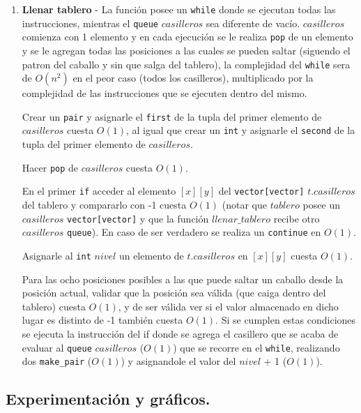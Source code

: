 \begin{enumerate}
 \item \textbf{Llenar tablero} - La función posee un \verb|while| donde se ejecutan
 todas las instrucciones, mientras el \verb|queue| $casilleros$ sea diferente de vacío.
 $casilleros$ comienza con 1 elemento y en cada ejecución se le realiza
 \verb|pop| de un elemento y se le agregan todas las posiciones a las cuales se 
 pueden saltar (siguendo el patron del caballo y sin que salga del tablero), la 
 complejidad del \verb|while| sera de $O(n^{2})$ en el peor caso (todos los casilleros), multiplicado 
 por la complejidad de las instrucciones que se ejecuten dentro del mismo.
 
 Crear un \verb|pair| y asignarle el \verb|first| de la tupla del primer elemento 
 de $casilleros$ cuesta $O(1)$, al igual que crear un \verb|int| y asignarle el
 \verb|second| de la tupla del primer elemento de $casilleros$.
 
 Hacer \verb|pop| de $casilleros$ cuesta $O(1)$.
 
 En el primer \verb|if| acceder al elemento $[x][y]$ del \verb|vector[vector]| 
 $t.casilleros$ del tablero y compararlo con -1 cuesta $O(1)$ (notar que $tablero$ 
 posee un $casilleros$ \verb|vector[vector]| y que la función $llenar\_tablero$ recibe otro $casilleros$ 
 \verb|queue|). En caso de ser verdadero se realiza un \verb|continue| en $O(1)$.
 
 Asignarle al \verb|int| $nivel$ un elemento de $t.casilleros$ en $[x][y]$ cuesta $O(1)$.
 
 Para las ocho posiciones posibles a las que puede saltar un caballo desde la posición
 actual, validar que la posición sea válida (que caiga dentro del tablero) cuesta 
 $O(1)$, y de ser válida ver si el valor almacenado en dicho lugar es distinto de -1
 también cuesta $O(1)$. Si se cumplen estas condiciones se ejecuta la instrucción 
 del if donde se agrega el casillero que se acaba de evaluar al \verb|queue| $casilleros$
 ($O(1)$) que se recorre en el \verb|while|, realizando dos \verb|make_pair| ($O(1)$) 
 y asignandole el valor del $nivel$ + 1 ($O(1)$).
 
\end{enumerate}

\newpage
\subsection{Experimentación y gráficos.}

\vspace*{0.3cm}

